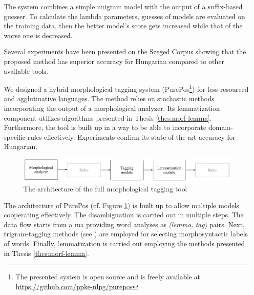 The system combines a simple unigram model with the output of a suffix-based guesser. 
To calculate the lambda parameters, guesses of models are evaluated on the training data, then the better model's score gets increased while that of the worse one is decreased.

Several experiments have been presented on the Szeged Corpus showing that the proposed method has superior accuracy for Hungarian compared to other available tools. 

\thesisline%


\begin{core}
\begin{thesis}\label{thes:morf-tagging}
We designed a hybrid morphological tagging system (PurePos\footnote{The presented system is open source and is freely available at \href{https://github.com/ppke-nlpg/purepos}{https://github.com/ppke-nlpg/purepos}}) for less-resourced and agglutinative languages.
The method relies on stochastic methods incorporating the output of a morphological analyzer.
Its lemmatization component utilizes algorithms presented in Thesis \ref{thes:morf-lemma}.
Furthermore, the tool is built up in a way to be able to incorporate domain-specific rules effectively.
Experiments confirm its state-of-the-art accuracy for Hungarian.
\end{thesis}

\begin{pub}
\cite{Orosz2011,Orosz2012,Orosz2012a,Orosz2013a}
\end{pub}
\end{core}

\begin{figure}[ht] 
  \centering
  \includegraphics[width=1\textwidth]{MorphTagging/architecture.png} 
  \caption{The architecture of the full morphological tagging tool}
  \label{fig:purepos-arch_en}
\end{figure}

The architecture of PurePos (cf. Figure \ref{fig:purepos-arch_en}) is built up to allow multiple models cooperating effectively. 
The disambiguation is carried out in multiple steps.
The data flow starts from a \acrshort{ma} providing word analyses as \emph{(lemma, tag)} pairs. 
Next, trigram-tagging methods (see \cite{Brants2000,Halacsy2007}) are employed for selecting morphosyntactic labels of words. 
Finally, lemmatization is carried out employing the methods presented in Thesis \ref{thes:morf-lemma}. 

